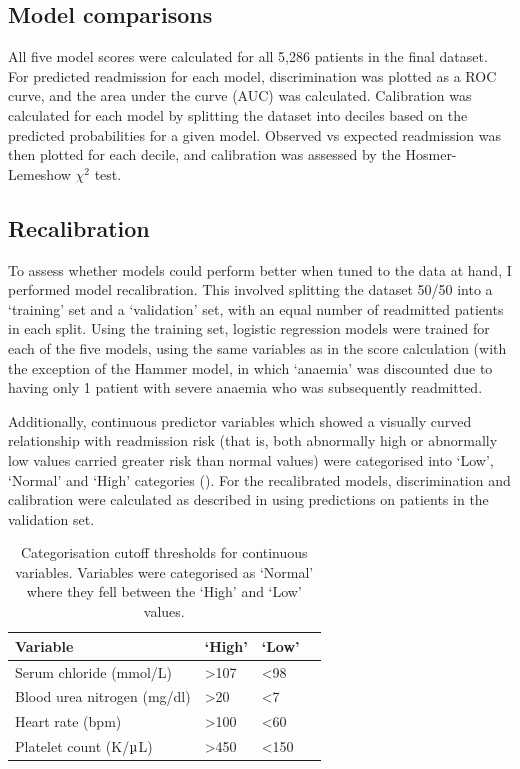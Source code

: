 \documentclass[onecolumn]{article}
\begin{document}
\subsection{Model comparisons}
\label{comparisonSection}

All five model scores were calculated for all 5,286 patients in the final dataset. For predicted readmission for each model, discrimination was plotted as a ROC curve, and the area under the curve (AUC) was calculated. Calibration was calculated for each model by splitting the dataset into deciles based on the predicted probabilities for a given model. Observed vs expected readmission was then plotted for each decile, and calibration was assessed by the Hosmer-Lemeshow $ \chi^{2} $ test.

\subsection{Recalibration}

To assess whether models could perform better when tuned to the data at hand, I performed model recalibration. This involved splitting the dataset 50/50 into a `training' set and a `validation' set, with an equal number of readmitted patients in each split. Using the training set, logistic regression models were trained for each of the five models, using the same variables as in the score calculation (with the exception of the Hammer model, in which `anaemia' was discounted due to having only 1 patient with severe anaemia who was subsequently readmitted. 

Additionally, continuous predictor variables which showed a visually curved relationship with readmission risk (that is, both abnormally high or abnormally low values carried greater risk than normal values) were categorised into `Low', `Normal' and `High' categories (). For the recalibrated models, discrimination and calibration were calculated as described in  using predictions on patients in the validation set.

\begin{table}
\centering
	\renewcommand{\arraystretch}{1.4}
		\caption{Categorisation cutoff thresholds for continuous variables. Variables were categorised as `Normal' where they fell between the `High' and `Low' values.}
		\begin{tabular}{llll}
		\hline
		Variable & `High' & `Low'\\
		\hline
		Serum chloride (mmol/L) & >107 & <98\\
		Blood urea nitrogen (mg/dl) & >20 & <7\\
		Heart rate (bpm) & >100 & <60\\
		Platelet count (K/$ \micro $L) & >450 & <150\\
		\hline
		\end{tabular}
	\label{CategorisationTable}
\end{table}
\end{document}
